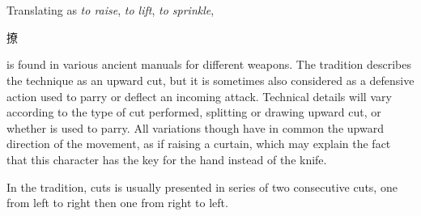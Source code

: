 \section{\Liao{}}
Translating as \textit{to raise}, \textit{to lift}, \textit{to sprinkle}, \Liao{} \begin{CJK*}{UTF8}{bsmi}撩\end{CJK*} is found in various ancient manuals for different weapons. The \Yangjia{} \Michuan{} tradition describes the technique as an upward cut, but it is sometimes also considered as a defensive action used to parry or deflect an incoming attack. Technical details will vary according to the type of cut performed, splitting or drawing upward cut, or whether \Liao{} is used to parry.
All variations though have in common the upward direction of the movement, as if raising a curtain, which may explain the fact that this character has the key for the hand instead of the knife.

In the \Yangjia{} \Michuan{} tradition, \Liao{} cuts is usually presented in series of two consecutive cuts, one from left to right then one from right to left.  

